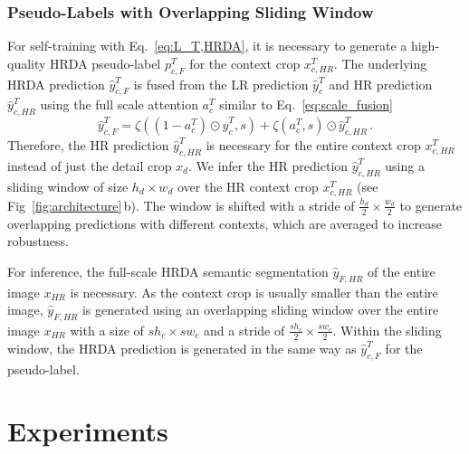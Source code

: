 \documentclass[journal,compsoc]{IEEEtran}
\begin{document}
\subsubsection{Pseudo-Labels with Overlapping Sliding Window}
\label{sec:overlapping_slide_inference}

For self-training with Eq.~\ref{eq:L_T,HRDA}, it is necessary to generate a high-quality HRDA pseudo-label $p_\mathit{c,F}^T$ for the context crop $x_\mathit{c,HR}^T$. The underlying HRDA prediction $\hat{y}_\mathit{c,F}^T$ is fused from the LR prediction $\hat{y}_c^T$ and HR prediction $\hat{y}_\mathit{c,HR}^T$ using the full scale attention $a_c^T$ similar to Eq.~\ref{eq:scale_fusion} \begin{equation}
    \hat{y}_\mathit{c,F}^T = \zeta((1 - a_c^T) \odot \hat{y}_c^T, s) + \zeta(a_c^T, s) \odot \hat{y}_\mathit{c,HR}^T\,.
\end{equation}
Therefore, the HR prediction $\hat{y}_\mathit{c,HR}^T$ is necessary for the entire context crop $x_\mathit{c,HR}^T$ instead of just the detail crop $x_d$.
We infer the HR prediction $\hat{y}_\mathit{c,HR}^T$ using a sliding window of size $h_d {\times} w_d$ over the HR context crop $x_\mathit{c,HR}^T$ (see Fig~\ref{fig:architecture}\,b). The window is shifted with a stride of $\frac{h_d}{2} {\times} \frac{w_d}{2}$ to generate overlapping predictions with different contexts, which are averaged to increase robustness.

For inference, the full-scale HRDA semantic segmentation $\hat{y}_\mathit{F,HR}$ of the entire image $x_\mathit{HR}$ is necessary. As the context crop is usually smaller than the entire image, $\hat{y}_\mathit{F,HR}$ is generated using an overlapping sliding window over the entire image $x_\mathit{HR}$ with a size of $sh_c {\times} sw_c$ and a stride of $\frac{sh_c}{2} {\times} \frac{sw_c}{2}$. Within the sliding window, the HRDA prediction is generated in the same way as $\hat{y}_\mathit{c,F}^T$ for the pseudo-label. 
\section{Experiments}
\label{sec:experiment}
\end{document}
